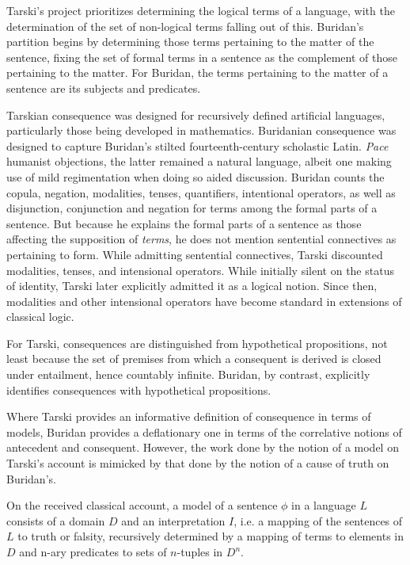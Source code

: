 \documentclass[]{article}
\begin{document}
Tarski's project prioritizes determining the logical terms of a language, with the determination of the set of non-logical terms falling out of this. Buridan's partition begins by determining those terms pertaining to the matter of the sentence, fixing the set of formal terms in a sentence as the complement of those pertaining to the matter. For Buridan, the terms pertaining to the matter of a sentence are its subjects and predicates.

Tarskian consequence was designed for recursively defined artificial languages, particularly those being developed in mathematics. Buridanian consequence was designed to capture Buridan's stilted fourteenth-century scholastic Latin. \textit{Pace} humanist objections, the latter remained a natural language, albeit one making use of mild regimentation when doing so aided discussion. Buridan counts the copula, negation, modalities, tenses, quantifiers, intentional operators, as well as disjunction, conjunction and negation for terms among the formal parts of a sentence. But because he explains the formal parts of a sentence as those affecting the supposition of \textit{terms}, he does not mention sentential connectives as pertaining to form. While admitting sentential connectives, Tarski discounted modalities, tenses, and intensional operators. While initially silent on the status of identity, Tarski later explicitly admitted it as a logical notion. Since then, modalities and other intensional operators have become standard in extensions of classical logic.

For Tarski, consequences are distinguished from hypothetical propositions, not least because the set of premises from which a consequent is derived is closed under entailment, hence countably infinite. Buridan, by contrast, explicitly identifies consequences with hypothetical propositions.


Where Tarski provides an informative definition of consequence in terms of models, Buridan provides a deflationary one in terms of the correlative notions of antecedent and consequent. However, the work done by the notion of a model on Tarski's account is mimicked by that done by the notion of a cause of truth on Buridan's. 

On the received classical account, a model of a sentence $\phi$ in a language $L$ consists of a domain $D$ and an interpretation $I$, i.e. a mapping of the sentences of $L$ to truth or falsity, recursively determined by a mapping of terms to elements in $D$ and n-ary predicates to sets of $n$-tuples in $D^{n}$.
\end{document}

